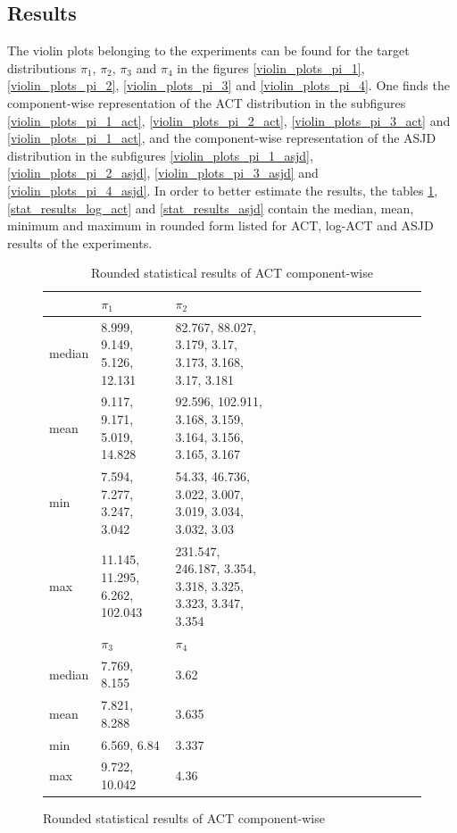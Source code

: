 \documentclass{scrartcl}
\begin{document}
    \subsection{Results}
    The violin plots belonging to the experiments can be found for the target distributions $\pi_1$, $\pi_2$, $\pi_3$ and $\pi_4$
    in the figures \ref{violin_plots_pi_1}, \ref{violin_plots_pi_2}, \ref{violin_plots_pi_3} and \ref{violin_plots_pi_4}. One finds the component-wise representation of the ACT distribution in the subfigures \ref{violin_plots_pi_1_act}, \ref{violin_plots_pi_2_act}, \ref{violin_plots_pi_3_act} and \ref{violin_plots_pi_1_act}, and
    the component-wise representation of the ASJD distribution in the subfigures \ref{violin_plots_pi_1_asjd}, \ref{violin_plots_pi_2_asjd}, \ref{violin_plots_pi_3_asjd} and \ref{violin_plots_pi_4_asjd}.
    In order to better estimate the results, the tables \ref{stat_results_act}, \ref{stat_results_log_act} and \ref{stat_results_asjd} contain the median, mean, minimum and maximum in rounded form
    listed for ACT, log-ACT and ASJD results of the experiments.

    \begin{figure}[H]
        \begin{table}[H]
            \centering
            \begin{tabular}{|l|l|l|l|l|l|l|l|l|l|l|l|l|l|l|}
                \hline & $\pi_1$ & $\pi_2$ \\ \hline
                median & 8.999, 9.149, 5.126, 12.131 & 82.767, 88.027, 3.179, 3.17, 3.173, 3.168, 3.17, 3.181 \\\hline
                mean & 9.117, 9.171, 5.019, 14.828 & 92.596, 102.911, 3.168, 3.159, 3.164, 3.156, 3.165, 3.167 \\\hline
                min & 7.594, 7.277, 3.247, 3.042 & 54.33, 46.736, 3.022, 3.007, 3.019, 3.034, 3.032, 3.03 \\\hline
                max & 11.145, 11.295, 6.262, 102.043 & 231.547, 246.187, 3.354, 3.318, 3.325, 3.323, 3.347, 3.354 \\\hline
                \hline & $\pi_3$ & $\pi_4$ \\ \hline
                median & 7.769, 8.155 & 3.62 \\\hline
                mean & 7.821, 8.288 & 3.635 \\\hline
                min & 6.569, 6.84 & 3.337 \\\hline
                max & 9.722, 10.042 & 4.36 \\\hline
            \end{tabular}
            \caption{Rounded statistical results of ACT component-wise}
            \label{stat_results_act}
        \end{table}
    \end{figure}
\end{document}

